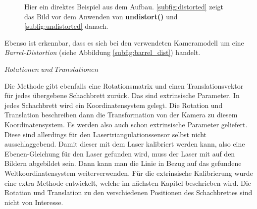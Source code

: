 		\begin{figure}[h]
			\centering
			\caption[Beispiel für die Verzerrung in Bildern]{Hier ein direktes Beispiel aus dem Aufbau. \ref{subfig:distorted} zeigt das Bild vor dem Anwenden von \textbf{undistort()} und \ref{subfig:undistorted} danach.}
			\label{fig:distortion_bsp}
		\end{figure}
	
		Ebenso ist erkennbar, dass es sich bei den verwendeten Kameramodell um eine \textit{Barrel-Distortion} (siehe Abbildung \ref{subfig:barrel_dist}) handelt.
		
		$\underline{Rotationen \; und \; Translationen}$
		
		Die Methode gibt ebenfalls eine Rotationsmatrix und einen Translationsvektor für jedes übergebene Schachbrett zurück. Das sind extrinsische Parameter. In jedes Schachbrett wird ein Koordinatensystem gelegt. Die Rotation und Translation beschreiben dann die Transformation von der Kamera zu diesem Koordinatensystem. Es werden also auch schon extrinsische Parameter geliefert. Diese sind allerdings für den Lasertriangulationssensor selbst nicht ausschlaggebend. Damit dieser mit dem Laser kalibriert werden kann, also eine Ebenen-Gleichung für den Laser gefunden wird, muss der Laser mit auf den Bildern abgebildet sein. Dann kann man die Linie in Bezug auf das gefundene Weltkoordinatensystem weiterverwenden. Für die extrinsische Kalibrierung wurde eine extra Methode entwickelt, welche im nächsten Kapitel beschrieben wird. Die Rotation und Translation zu den verschiedenen Positionen des Schachbrettes sind nicht von Interesse. 
		
